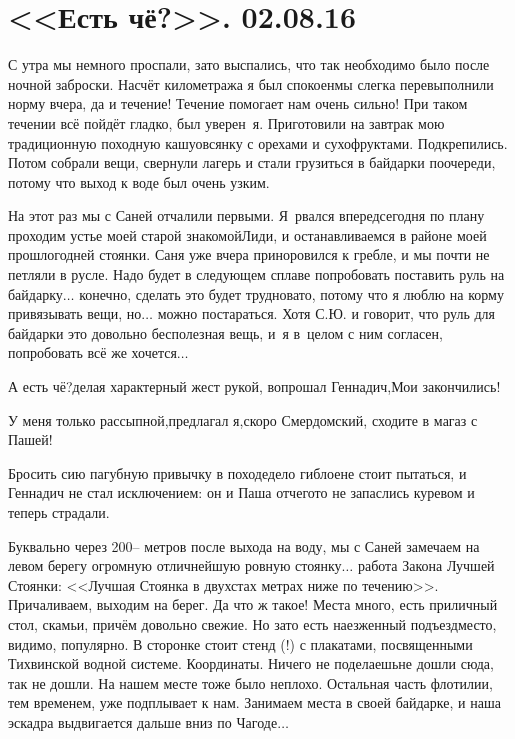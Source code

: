 \chapter{<<Есть чё?>>. 02.08.16} 

С утра мы немного проспали, зато выспались, что так необходимо было после ночной заброски. Насчёт километража я был спокоен\mdash мы слегка перевыполнили норму вчера, да и течение! Течение помогает нам очень сильно! При таком течении всё пойдёт гладко, был уверен~я. Приготовили на завтрак мою традиционную походную кашу\mdash овсянку с орехами и сухофруктами. Подкрепились. Потом собрали вещи, свернули лагерь и стали грузиться в байдарки по\sdash очереди, потому что выход к воде был очень узким. 

На этот раз мы с Саней отчалили первыми. Я~рвался вперед\mdash  сегодня по плану проходим устье моей старой знакомой\mdash  Лиди, и останавливаемся в районе моей прошлогодней стоянки. Саня уже вчера приноровился к гребле, и мы почти не петляли в русле. Надо будет в следующем сплаве попробовать поставить руль на байдарку$\ldots$ конечно, сделать это будет трудновато, потому что я люблю на корму привязывать вещи, но$\ldots$ можно постараться. Хотя С.Ю. и говорит, что руль для байдарки это довольно бесполезная вещь, и~я в~целом с ним согласен, попробовать всё же хочется$\ldots$ 

\diagdash А есть чё?\mdash делая характерный жест рукой, вопрошал Геннадич,\mdash Мои закончились!

\diagdash У меня только рассыпной,\mdash предлагал я,\mdash скоро Смердомский, сходите в магаз с Пашей!

Бросить сию пагубную привычку в походе\mdash дело гиблое\mdash не стоит пытаться, и Геннадич не стал исключением: он и Паша отчего\sdash то не запаслись куревом и теперь страдали.

Буквально через 200\thinspace\nobreakdash-- метров после выхода на воду, мы с Саней замечаем на левом берегу огромную отличнейшую ровную стоянку$\ldots$  работа Закона Лучшей Стоянки: <<Лучшая Стоянка в двухстах метрах ниже по течению>>. Причаливаем, выходим на берег. Да что ж такое! Места много, есть приличный стол, скамьи, причём довольно свежие. Но зато есть наезженный подъезд\mdash  место, видимо, популярно. В сторонке стоит стенд (!) с плакатами, посвященными Тихвинской водной системе. Координаты\mdash \CoordsChagodaGood. Ничего не поделаешь\mdash  не дошли сюда, так не дошли. На нашем месте тоже было неплохо. Остальная часть флотилии, тем временем, уже подплывает к нам. Занимаем места в своей байдарке, и наша эскадра выдвигается дальше вниз по Чагоде$\ldots$  

